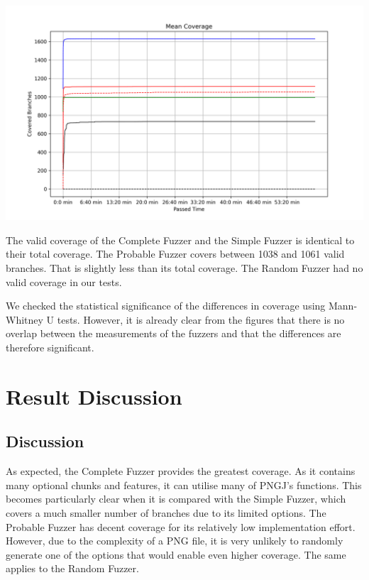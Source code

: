 \documentclass[runningheads]{llncs}
\begin{document}
\begin{center}
\includegraphics[width=\textwidth]{img/average_coverage}
\label{fig4}
\end{center}
The valid coverage of the Complete Fuzzer and the Simple Fuzzer is identical to their total coverage. The Probable Fuzzer covers between 1038 and 1061 valid branches. That is slightly less than its total coverage. The Random Fuzzer had no valid coverage in our tests.

We checked the statistical significance of the differences in coverage using Mann-Whitney U tests. However, it is already clear from the figures that there is no overlap between the measurements of the fuzzers and that the differences are therefore significant.

\section{Result Discussion}
\subsection{Discussion}
As expected, the Complete Fuzzer provides the greatest coverage. As it contains many optional chunks and features, it can utilise many of PNGJ's functions. This becomes particularly clear when it is compared with the Simple Fuzzer, which covers a much smaller number of branches due to its limited options. The Probable Fuzzer has decent coverage for its relatively low implementation effort. However, due to the complexity of a PNG file, it is very unlikely to randomly generate one of the options that would enable even higher coverage. The same applies to the Random Fuzzer.
\end{document}

